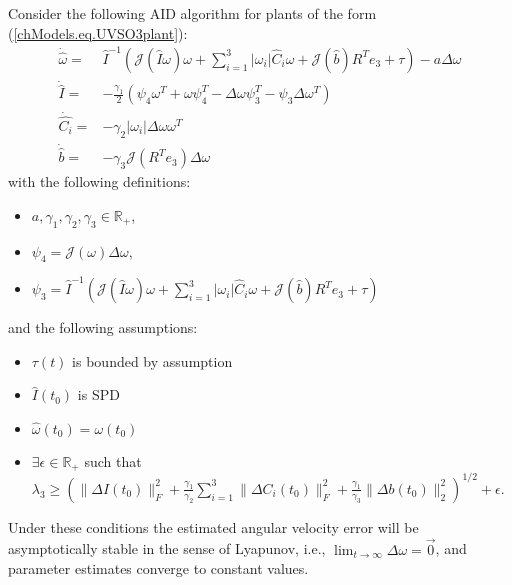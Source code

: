 \begin{UV_SO3_AID}
\label{chUV_AID.theo.UV_SO3_AID}
Consider the following \ac{AID} algorithm for plants of the form
(\ref{chModels.eq.UVSO3plant}):
%
\begin{align}
  \dot{\hat{\omega}}=&\hat{I}^{-1}\left( \mathcal{J}(\hat{I}\omega)\omega
  +\sum_{i=1}^3 |\omega_i|\hat{C}_i\omega+\mathcal{J}(\hat{b})R^T e_3
  + \tau \right) - a \Delta \omega   \label{chUV_AID.eq.UV_SO3_Estimator}\\
  \dot{\hat{I}}=&-\frac{\gamma_1}{2}\left(\psi_4 \omega^T 
    +\omega \psi_4^T-\Delta\omega \psi_3^T
  -\psi_3 \Delta\omega^T\right)\label{chUV_AID.eq.UV_SO3_MassId}\\
  \dot{\hat{C_i}}=&-\gamma_2|\omega_i|\Delta\omega \omega^T
  \label{chUV_AID.eq.UV_SO3_DragId}\\
   \dot{\hat{b}}=&-\gamma_3\mathcal{J}(R^T e_3)\Delta\omega
  \label{chUV_AID.eq.UV_SO3_BuoyId}
\end{align}
%
\noindent with the following definitions:
%
\begin{itemize}
\item $a,\gamma_1,\gamma_2,\gamma_3\in\mathbb{R}_+$,
\item $\psi_4=\mathcal{J}(\omega)\Delta \omega$,
\item $\psi_3=\hat{I}^{-1}\left(\mathcal{J}(\hat{I}\omega)\omega
  +\sum_{i=1}^3 |\omega_i|\hat{C}_i \omega+\mathcal{J}(\hat{b})R^T e_3
  +\tau\right)$
\end{itemize} 
%
\noindent and the following assumptions:
%
\begin{itemize}
\item $\tau(t)$ is bounded by assumption 
\item $\hat{I}(t_0)$ is \ac{SPD}
\item $\hat{\omega}(t_0)=\omega(t_0)$
\item $\exists \epsilon \in \mathbb{R}_+$ such that
  $ \lambda_3 \geq\left(\|\Delta I(t_0)\|_F^2 +
   \frac{\gamma_1}{\gamma_2}\sum_{i=1}^3 \|\Delta C_i(t_0)\|_F^2 + 
   \frac{\gamma_1}{\gamma_3}\|\Delta b(t_0)\|_2^2\right)^{1/2}+\epsilon.$
\end{itemize}
%
\noindent Under these conditions the estimated angular velocity error
will be asymptotically stable in the sense of Lyapunov, i.e.,
$\lim_{t\to \infty}\Delta \omega=\vec{0}$, and parameter estimates
converge to constant values.
\end{UV_SO3_AID}

